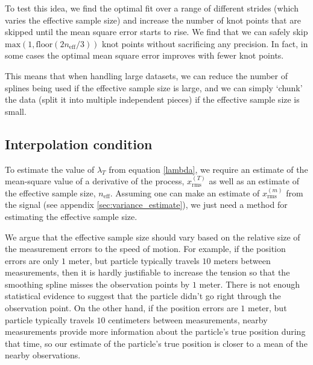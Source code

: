 \documentclass[10pt,journal]{IEEEtran}
\begin{document}
To test this idea, we find the optimal fit over a range of different strides (which varies the effective sample size) and increase the number of knot points that are skipped until the mean square error starts to rise. We find that we can safely skip $\textrm{max}(1,\textrm{floor}(2n_{\textrm{eff}}/3))$ knot points without sacrificing any precision. In fact, in some cases the optimal mean square error improves with fewer knot points.

This means that when handling large datasets, we can reduce the number of splines being used if the effective sample size is large, and we can simply `chunk' the data (split it into multiple independent pieces) if the effective sample size is small.

\subsection{Interpolation condition} \label{interpolation_condition}

To estimate the value of $\lambda_T$ from equation \ref{lambda}, we require an estimate of the mean-square value of a derivative of the process, $x_{\textrm{rms}}^{(T)}$ as well as an estimate of the effective sample size, $n_{\textrm{eff}}$. Assuming one can make an estimate of $x_{\textrm{rms}}^{(m)}$ from the signal (see appendix \ref{sec:variance_estimate}), we just need a method for estimating the effective sample size.

We argue that the effective sample size should vary based on the relative size of the measurement errors to the speed of motion. For example, if the position errors are only $1$ meter, but particle typically travels $10$ meters between measurements, then it is hardly justifiable to increase the tension so that the smoothing spline misses the observation points by $1$ meter. There is not enough statistical evidence to suggest that the particle didn't go right through the observation point. On the other hand, if the position errors are $1$ meter, but particle typically travels $10$ centimeters between measurements, nearby measurements provide more information about the particle's true position during that time, so our estimate of the particle's true position is closer to a mean of the nearby observations.
\end{document}
